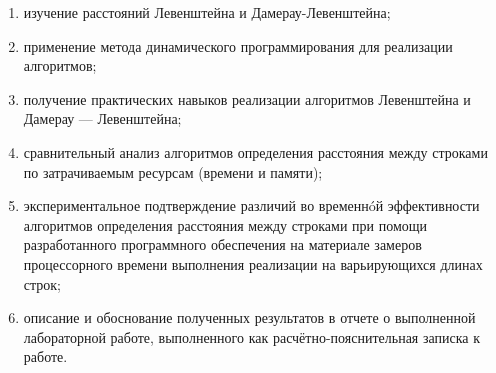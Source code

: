 \begin{enumerate}[label=\arabic*)]
	\item изучение расстояний Левенштейна и Дамерау-Левенштейна;
	\item применение метода динамического программирования для реализации алгоритмов;
	\item получение практических навыков реализации алгоритмов Левенштейна и Дамерау — Левенштейна;
	\item сравнительный анализ алгоритмов определения расстояния между строками по затрачиваемым ресурсам (времени и памяти);
	\item экспериментальное подтверждение различий во временнóй эффективности алгоритмов определения расстояния между строками при помощи разработанного программного обеспечения на материале замеров процессорного времени выполнения реализации на варьирующихся длинах строк; 
	\item описание и обоснование полученных результатов в отчете о выполненной лабораторной работе, выполненного как расчётно-пояснительная записка к работе.
\end{enumerate}
